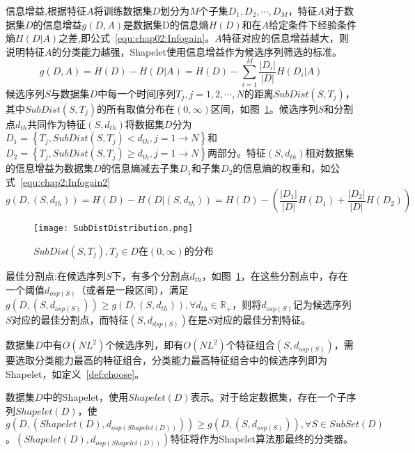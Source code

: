 \begin{definition}
	\label{def:chap02:infogain}
	信息增益,根据特征$A$将训练数据集$D$划分为$M$个子集$D_1,D_2,\cdots,D_M$，特征$A$对于数据集$D$的信息增益$g(D,A)$是数据集D的信息熵$H(D)$和在$A$给定条件下经验条件熵$H(D|A)$之差,即公式~\ref{equ:chap02:Infogain}。$A$特征对应的信息增益越大，则说明特征$A$的分类能力越强，Shapelet使用信息增益作为候选序列筛选的标准。
	\begin{equation}
	\label{equ:chap02:Infogain}
	g(D,A) = H(D) - H(D|A) = H(D) - \sum_{i=1}^{M}\frac{|D_i|}{|D|}H(D_i|A)
	\end{equation}
	候选序列$S$与数据集$D$中每一个时间序列$T_j,j=1,2,\cdots,N$的距离$SubDist(S,T_j)$，其中$SubDist(S,T_j)$的所有取值分布在$(0,\infty)$区间，如图~\ref{fig:SubDist}。候选序列$S$和分割点$d_{th}$共同作为特征$(S,d_{th})$将数据集$D$分为$D_1 = \left\lbrace T_j,SubDist(S,T_j)<d_{th},j=1\to N\right\rbrace $和$D_2 = \left\lbrace T_j,SubDist(S,T_j) \geq d_{th},j=1\to  N\right\rbrace$两部分。特征$(S,d_{th})$相对数据集的信息增益为数据集$D$的信息熵减去子集$D_1$和子集$D_2$的信息熵的权重和，如公式~\ref{equ:chap2:Infogain2}
	\begin{equation}
	\label{equ:chap2:Infogain2}
	g(D,(S,d_{th})) =H(D)-H(D|(S,d_{th})) = H(D)-(\frac{|D_1|}{|D|}H(D_1)+\frac{|D_2|}{|D|}H(D_2))
	\end{equation}	
\end{definition}

\begin{figure}[H] %
\centering
\texttt{[image: SubDistDistribution.png]}
\caption{$SubDist(S,T_j),T_j\in D$在$(0,\infty)$的分布}
\label{fig:SubDist}
\end{figure}

\begin{definition}
	\label{def:optimalsplitpoint}
	最佳分割点:在候选序列$S$下，有多个分割点$d_{th}$，如图~\ref{fig:SubDist}，在这些分割点中，存在一个阈值$d_{osp(S)}$（或者是一段区间），满足$g(D,(S,d_{osp(S)})) \geq g(D,(S,d_{th})),\forall d_{th}\in \mathbb{R}_{+}$，则将$d_{osp(S)}$记为候选序列$S$对应的最佳分割点，而特征$(S,d_{dsp(S)})$在是$S$对应的最佳分割特征。
\end{definition}

数据集$D$中有$O(NL^2)$个候选序列，即有$O(NL^2)$个特征组合$(S,d_{osp(S)})$，需要选取分类能力最高的特征组合，分类能力最高特征组合中的候选序列即为Shapelet，如定义~\ref{def:choose}。

\begin{definition}
	\label{def:choose}
	数据集$D$中的Shapelet，使用$Shapelet(D)$表示。对于给定数据集，存在一个子序列$Shapelet(D)$，使$g(D,(Shapelet(D),d_{osp(Shapelet(D))})) \geq g(D,(S,d_{osp(S)})),\forall S\in SubSet(D)$。$(Shapelet(D),d_{osp(Shapelet(D))})$特征将作为Shapelet算法那最终的分类器。
\end{definition}


